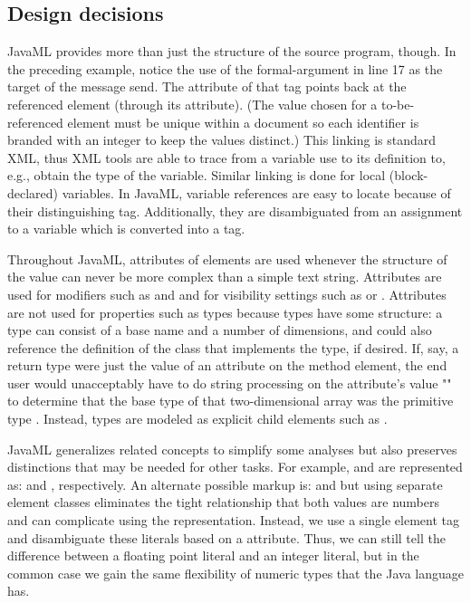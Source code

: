 \documentclass{article}
\begin{document}
\begin{multicols}{2}
\subsection{Design decisions}
\label{ssec-design}

JavaML provides more than just the structure of the source program,
though.  In the preceding example, notice the use of the formal-argument
 in line 17 as the target of the message send.  The
 attribute of that  tag points back at
the referenced  element (through its
 attribute).  (The  value chosen for a
to-be-referenced element must be unique within a document so each
identifier is branded with an integer to keep the values distinct.)
This linking is standard XML, thus XML tools are able to trace from a
variable use to its definition to, e.g., obtain the type of the
variable.  Similar linking is done for local (block-declared) variables.
In JavaML, variable references are easy to locate because of their
distinguishing  tag.  Additionally, they are
disambiguated from an assignment to a variable which is converted into a
 tag.

Throughout JavaML, attributes of elements are used whenever the
structure of the value can never be more complex than a simple text
string.  Attributes are used for modifiers such as
 and  and for visibility settings
such as  or .  Attributes are not
used for properties such as types because types have some structure: a
type can consist of a base name and a number of dimensions, and could
also reference the definition of the class that implements the type, if
desired.  If, say, a return type were just the value of an attribute on
the method element, the end user would unacceptably have to do string
processing on the attribute's value "" to determine
that the base type of that two-dimensional array was the primitive type
.  Instead, types are modeled as explicit child elements
such as .

JavaML generalizes related concepts to simplify some analyses but also
preserves distinctions that may be needed for other tasks.  For example,
 and  are represented as:
 and
, respectively.  An
alternate possible markup is: 
and  but using separate element
classes eliminates the tight relationship that both values are numbers
and can complicate using the representation.  Instead, we use a single
element tag and disambiguate these literals based on a 
attribute. Thus, we can still tell the difference between a floating
point literal and an integer literal, but in the common case we gain the
same flexibility of numeric types that the Java language has.


\end{multicols}
\end{document}
